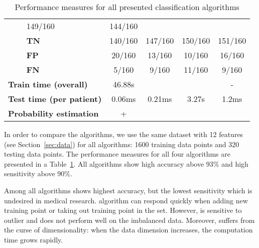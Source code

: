 \begin{table}[]
\begin{center}
\begin{tabular}{|l|l|c|c|c|c|}
		                    &    
		                    149/160                               
		&                144/160                    \\ \cline{2-6} 
		& \textbf{TN} &     140/160                        
		&     147/160                                        
		&               
		      150/160              &    
		      151/160                                \\ 
		\cline{2-6} 
		& \textbf{FP} & 20/160                             
		&   13/160                                          
		&               
		    10/160                &          
		    16/160                          \\ 
		\cline{2-6} 
		& \textbf{FN} & 5/160                            
		&  9/160                                           
		&               
		   11/160                 &                  
		   9/160                  \\ 
		\hline
		\multicolumn{2}{|l|}{\textbf{Train time (overall)}} 
		&46.88s &&&-\\
		\hline
		\multicolumn{2}{|l|}{\textbf{Test time (per 
		patient)}}                                    &               
		       0.06ms             
		&       0.21ms                                      
		&               
		   3.27s                 &               
		   1.2ms                     \\ 
		\hline
		\multicolumn{2}{|l|}{\textbf{Probability 
		estimation}}                                     & 
		+                                 &                           
		                  &                                   
		&                                    \\ \hline
	\end{tabular}
\end{center}
\caption{Performance measures for all presented classification 
algorithms}
\label{tbl:res}
\end{table}


In order to compare the algorithms, we use the same dataset with 12 
features (see Section~\ref{sec:data}) for all algorithms: 1600 
training data points and 320 testing data points.
The performance measures for all four algorithms are presented in a 
Table~\ref{tbl:res}.
All algorithms show high accuracy above $93\%$ and high sensitivity 
above $90\%$. 

Among all algorithms \knn{} shows highest accuracy, but the lowest 
sensitivity which is undesired in medical research. 
\knn{} algorithm can respond quickly when adding new training 
point or taking out training point in the set. However, \knn{} is 
sensitive to outlier and does not perform well on the imbalanced 
data. 
Moreover, \knn{} suffers from the curse of dimensionality: when the 
data dimension increases, the computation time grows rapidly. 

